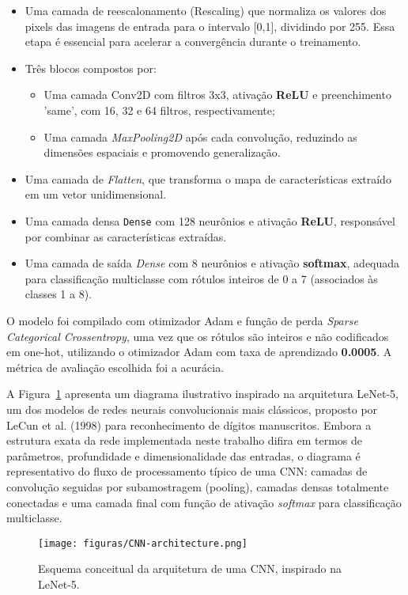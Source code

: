 \begin{itemize}
\item Uma camada de reescalonamento (Rescaling) que normaliza os valores dos pixels das imagens de entrada para o intervalo
[0,1], dividindo por 255. Essa etapa é essencial para acelerar a convergência durante o treinamento.
\item Três blocos compostos por:
    \begin{itemize}
        \item Uma camada Conv2D com filtros 3x3, ativação \textbf{ReLU} e preenchimento 'same', com 16, 32 e 64 filtros, respectivamente; 
        \item Uma camada \textit{MaxPooling2D} após cada convolução, reduzindo as dimensões espaciais e promovendo generalização.
    \end{itemize}
\item Uma camada de \textit{Flatten}, que transforma o mapa de características extraído em um vetor unidimensional.
\item Uma camada densa \texttt{Dense}  com 128 neurônios e ativação \textbf{ReLU}, responsável por combinar as características extraídas.
\item Uma camada de saída \textit{Dense} com 8 neurônios e ativação \textbf{softmax}, adequada para classificação multiclasse com rótulos 
inteiros de 0 a 7 (associados às classes 1 a 8).
\end{itemize}

O modelo foi compilado com otimizador Adam e função de perda \textit{Sparse Categorical Crossentropy}, uma vez que os rótulos são 
inteiros e não codificados em one-hot, utilizando o otimizador Adam com taxa de aprendizado \textbf{0.0005}. A métrica de avaliação 
escolhida foi a acurácia.

A Figura~\ref{fig:modelo-cnn} apresenta um diagrama ilustrativo inspirado na arquitetura LeNet-5, 
um dos modelos de redes neurais convolucionais mais clássicos, proposto por LeCun et al. (1998) para 
reconhecimento de dígitos manuscritos. Embora a estrutura exata da rede implementada neste trabalho difira em 
termos de parâmetros, profundidade e dimensionalidade das entradas, o diagrama é representativo do fluxo de 
processamento típico de uma CNN: camadas de convolução seguidas por subamostragem (pooling), camadas densas 
totalmente conectadas e uma camada final com função de ativação \textit{softmax} para classificação multiclasse.

\begin{figure}[H]
    \centering
    \texttt{[image: figuras/CNN-architecture.png]}
    \caption{Esquema conceitual da arquitetura de uma CNN, inspirado na LeNet-5.}
    \label{fig:modelo-cnn}
\end{figure}

